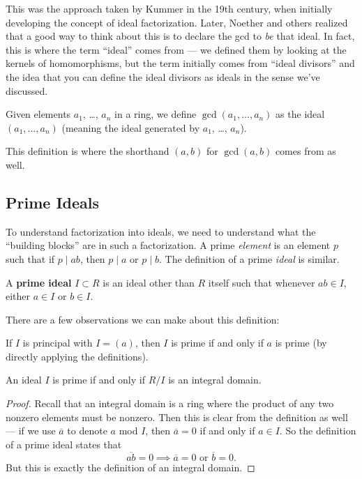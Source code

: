 This was the approach taken by Kummer in the 19th century, when initially developing the concept of ideal factorization. Later, Noether and others realized that a good way to think about this is to declare the gcd to \emph{be} that ideal. In fact, this is where the term ``ideal'' comes from --- we defined them by looking at the kernels of homomorphisms, but the term initially comes from ``ideal divisors'' and the idea that you can define the ideal divisors as ideals in the sense we've discussed.  
\begin{definition}
Given elements $a_1$, \ldots, $a_n$ in a ring, we define $\gcd(a_1, \ldots, a_n)$ as the ideal $(a_1, \ldots, a_n)$ (meaning the ideal generated by $a_1$, \ldots, $a_n$). 
\end{definition}

This definition is where the shorthand $(a, b)$ for $\gcd(a, b)$ comes from as well. 

\subsection{Prime Ideals}

To understand factorization into ideals, we need to understand what the ``building blocks'' are in such a factorization. A prime \emph{element} is an element $p$ such that if $p \mid ab$, then $p \mid a$ or $p \mid b$. The definition of a prime \emph{ideal} is similar. 

\begin{definition}
    A \textbf{prime ideal} $I \subset R$ is an ideal other than $R$ itself such that whenever $ab \in I$, either $a \in I$ or $b \in I$. 
\end{definition}

There are a few observations we can make about this definition:

\begin{example}
    If $I$ is principal with $I = (a)$, then $I$ is prime if and only if $a$ is prime (by directly applying the definitions). 
\end{example}

\begin{lemma}
    An ideal $I$ is prime if and only if $R/I$ is an integral domain.
\end{lemma}

\begin{proof}
    Recall that an integral domain is a ring where the product of any two nonzero elements must be nonzero. Then this is clear from the definition as well --- if we use $\overline{a}$ to denote $a$ mod $I$, then $\overline{a} = 0$ if and only if $a \in I$. So the definition of a prime ideal states that \[\overline{ab} = 0 \implies \overline{a} = 0 \text{ or } \overline{b} = 0.\] But this is exactly the definition of an integral domain. 
\end{proof}

